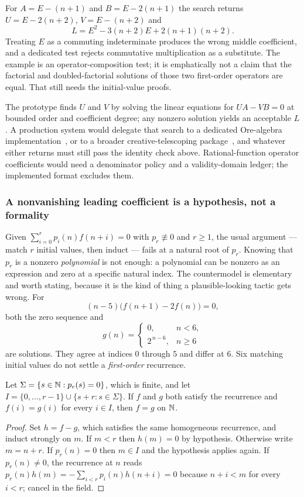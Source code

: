For $A=E-(n+1)$ and $B=E-2(n+1)$ the search returns $U=E-2(n+2)$,
$V=E-(n+2)$ and
\[
 L=E^2-3(n+2)E+2(n+1)(n+2).
\]
Treating $E$ as a commuting indeterminate produces the wrong middle
coefficient, and a dedicated test rejects commutative multiplication as a
substitute. The example is an operator-composition test; it is emphatically not
a claim that the factorial and doubled-factorial solutions of those two
first-order operators are equal. That still needs the initial-value proofs.

The prototype finds $U$ and $V$ by solving the linear equations for
$UA-VB=0$ at bounded order and coefficient degree; any nonzero solution yields
an acceptable $L$. A production system would delegate that search to a
dedicated Ore-algebra implementation~\cite{ore-algebra}, or to a broader
creative-telescoping package~\cite{holonomic}, and whatever either returns must
still pass the identity check above. Rational-function operator coefficients
would need a denominator policy and a validity-domain ledger; the implemented
format excludes them.

\subsubsection*{A nonvanishing leading coefficient is a hypothesis, not a formality}

Given $\sum_{i=0}^r p_i(n)f(n+i)=0$ with $p_r\not\equiv0$ and $r\ge1$, the usual
argument --- match $r$ initial values, then induct --- fails at a natural root
of $p_r$. Knowing that $p_r$ is a nonzero \emph{polynomial} is not enough: a
polynomial can be nonzero as an expression and zero at a specific natural index.
The countermodel is elementary and worth stating, because it is the kind of
thing a plausible-looking tactic gets wrong. For
\[
 (n-5)\bigl(f(n+1)-2f(n)\bigr)=0,
\]
both the zero sequence and
\[
 g(n)=\begin{cases}0,&n<6,\\2^{\,n-6},&n\ge6\end{cases}
\]
are solutions. They agree at indices $0$ through $5$ and differ at $6$. Six
matching initial values do not settle a \emph{first-order} recurrence.

\begin{theorem}\label{thm:seeds}
Let $\Sigma=\{s\in\mathbb{N}:p_r(s)=0\}$, which is finite, and let
$I=\{0,\ldots,r-1\}\cup\{s+r:s\in\Sigma\}$. If $f$ and $g$ both satisfy the
recurrence and $f(i)=g(i)$ for every $i\in I$, then $f=g$ on $\mathbb{N}$.
\end{theorem}
\begin{proof}
Set $h=f-g$, which satisfies the same homogeneous recurrence, and induct
strongly on $m$. If $m<r$ then $h(m)=0$ by hypothesis. Otherwise write $m=n+r$.
If $p_r(n)=0$ then $m\in I$ and the hypothesis applies again. If $p_r(n)\ne0$,
the recurrence at $n$ reads
$p_r(n)h(m)=-\sum_{i<r}p_i(n)h(n+i)=0$ because $n+i<m$ for every $i<r$;
cancel in the field.
\end{proof}

